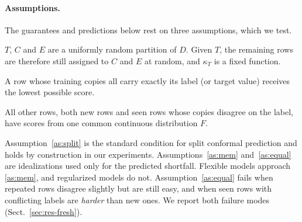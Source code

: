\paragraph{Assumptions.} The guarantees and predictions below rest on three assumptions, which we test.
\begin{assumption}\label{as:split}
$T$, $C$ and $E$ are a uniformly random partition of $D$. Given $T$, the remaining rows are therefore still assigned to $C$ and $E$ at random, and $\kappa_T$ is a fixed function.
\end{assumption}
\begin{assumption}[Memorization]\label{as:mem}
A row whose training copies all carry exactly its label (or target value) receives the lowest possible score.
\end{assumption}
\begin{assumption}\label{as:equal}
All other rows, both new rows and seen rows whose copies disagree on the label, have scores from one common continuous distribution $F$.
\end{assumption}
Assumption~\ref{as:split} is the standard condition for split conformal prediction and holds by construction in our experiments. Assumptions~\ref{as:mem} and~\ref{as:equal} are idealizations used only for the predicted shortfall. Flexible models approach \ref{as:mem}, and regularized models do not. Assumption~\ref{as:equal} fails when repeated rows disagree slightly but are still easy, and when seen rows with conflicting labels are \emph{harder} than new ones. We report both failure modes (Sect.~\ref{sec:res-fresh}).
